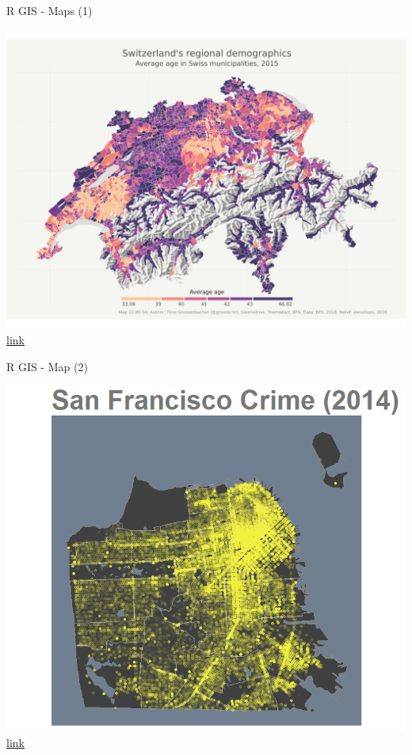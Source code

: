 \documentclass[8pt,ignorenonframetext,]{beamer}
\begin{document}
\begin{frame}{R GIS - Maps (1)}

\includegraphics{imgPres/demo/R_as_a_GIS.png}
\href{https://timogrossenbacher.ch/2016/12/beautiful-thematic-maps-with-ggplot2-only/}{link}

\end{frame}

\begin{frame}{R GIS - Map (2)}

\includegraphics{imgPres/map_SF_Crime2014.png}
\href{http://sharpsightlabs.com/blog/mapping-san-francisco-crime/}{link}

\end{frame}
\end{document}

